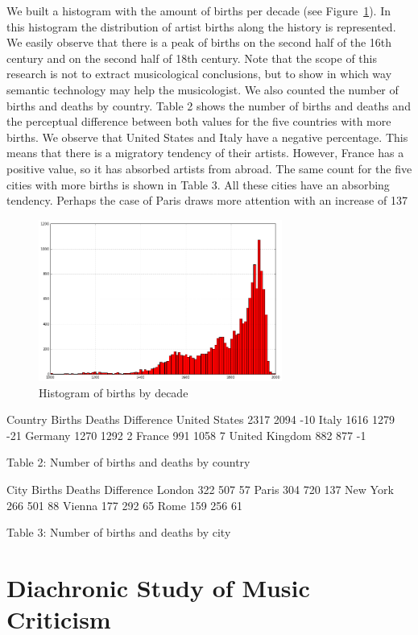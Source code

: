 We built a histogram with the amount of births per decade (see Figure~\ref{fig:musicology:hist-births}). In this histogram the distribution of artist births along the history is represented. We easily observe that there is a peak of births on the second half of the 16th century and on the second half of 18th century. Note that the scope of this research is not to extract musicological conclusions, but to show in which way semantic technology may help the musicologist. 
We also counted the number of births and deaths by country. Table 2 shows the number of births and deaths and the perceptual difference between both values for the five countries with more births. We observe that United States and Italy have a negative percentage. This means that there is a migratory tendency of their artists. However, France has a positive value, so it has absorbed artists from abroad. The same count for the five cities with more births is shown in Table 3. All these cities have an absorbing tendency. Perhaps the case of Paris draws more attention with an increase of 137%

\begin{figure}[!ht]
	\centering
	\includegraphics[width=8cm]{ch05_musicology/pics/histogram-births.jpg}
	\caption{Histogram of births by decade
	\label{fig:musicology:hist-births}}
\end{figure}

Country	Births	Deaths	Difference
United States	2317	2094	-10%
Italy	1616	1279	-21%
Germany	1270	1292	2%
France	991	1058	7%
United Kingdom	882	877	-1%

Table 2: Number of births and deaths by country


City	Births	Deaths	Difference
London	322	507	57%
Paris	304	720	137%
New York	266	501	88%
Vienna	177	292	65%
Rome	159	256	61%

Table 3: Number of births and deaths by city



\section{Diachronic Study of Music Criticism}\label{sec:musicology:evolution}

